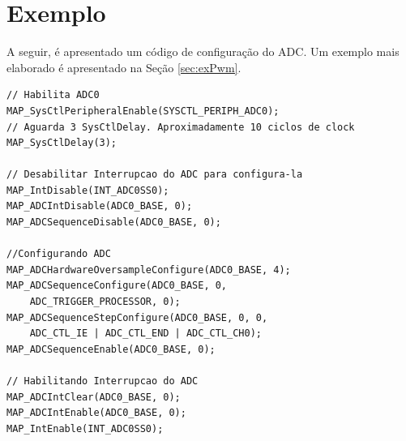 \section{Exemplo}

A seguir, é apresentado um código de configuração do ADC. Um exemplo mais elaborado é apresentado na Seção \ref{sec:exPwm}.

\begin{lstlisting}[style=citacao]
// Habilita ADC0
MAP_SysCtlPeripheralEnable(SYSCTL_PERIPH_ADC0);
// Aguarda 3 SysCtlDelay. Aproximadamente 10 ciclos de clock
MAP_SysCtlDelay(3);

// Desabilitar Interrupcao do ADC para configura-la
MAP_IntDisable(INT_ADC0SS0);
MAP_ADCIntDisable(ADC0_BASE, 0);
MAP_ADCSequenceDisable(ADC0_BASE, 0);

//Configurando ADC
MAP_ADCHardwareOversampleConfigure(ADC0_BASE, 4);
MAP_ADCSequenceConfigure(ADC0_BASE, 0,
	ADC_TRIGGER_PROCESSOR, 0);
MAP_ADCSequenceStepConfigure(ADC0_BASE, 0, 0,
	ADC_CTL_IE | ADC_CTL_END | ADC_CTL_CH0);
MAP_ADCSequenceEnable(ADC0_BASE, 0);

// Habilitando Interrupcao do ADC
MAP_ADCIntClear(ADC0_BASE, 0);
MAP_ADCIntEnable(ADC0_BASE, 0);
MAP_IntEnable(INT_ADC0SS0);
\end{lstlisting}
